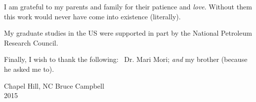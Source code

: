 

\def\baselinestretch{1.0}
 I am grateful to my parents and family for their
patience and {\em love}. Without them this work would never have come into
existence (literally).

My graduate studies in the US were supported in part by the National
Petroleum Research Council.

\medskip
Finally, I wish to thank the following: \,  Dr. Mari Mori;
{\em and } my brother (because he asked me to).

\bigskip\medskip

\noindent Chapel Hill, NC \hfill Bruce Campbell\\
2015

